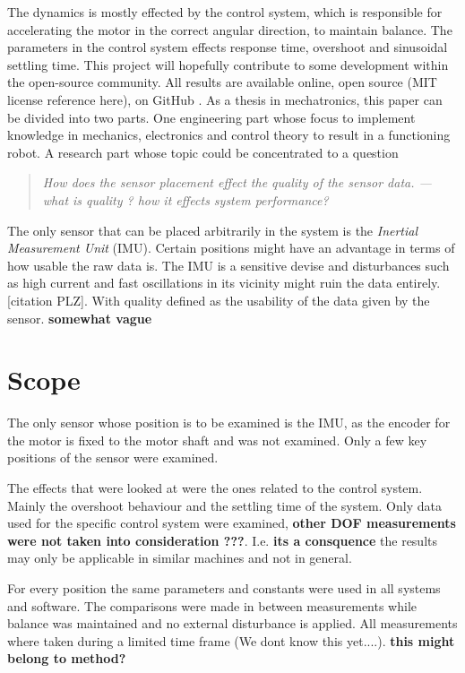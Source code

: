\documentclass[a4paper,11pt]{kth-mag}
\begin{document}
The dynamics is mostly effected by the control system, which is responsible for accelerating the motor in the  correct angular direction, to maintain balance. The parameters in the control system effects response time, overshoot and sinusoidal settling time.
This project will hopefully contribute to some development within the open-source community.
All results are available online, open source (MIT license reference here), on GitHub \cite{Github}.
As a thesis in mechatronics, this paper can be divided into two parts. One engineering part whose focus to implement knowledge in mechanics, electronics and control theory to result in a functioning robot. A research part whose topic could be concentrated to a question 

\begin{quote}
\textit{
How does the sensor placement effect the quality of the sensor data. --- what is quality ? how it effects system performance?}
\end{quote}
The only sensor that can be placed arbitrarily in the system is the \textit{Inertial Measurement Unit} (IMU). Certain positions might have an advantage in terms of how usable the raw data is. The IMU is a sensitive devise and disturbances such as high current and fast oscillations in its vicinity might ruin the data entirely.[citation PLZ]. With quality defined as the usability of the data given by the sensor. \textbf{somewhat vague}

\section{Scope}
The only sensor whose position is to be examined is the IMU, as the encoder for the motor is fixed to the motor shaft and was not examined. Only a few key positions of the sensor were examined.

The effects that were looked at were the ones related to the control system. Mainly the overshoot behaviour and the settling time of the system. Only data used for the specific control system were examined, \textbf{other DOF measurements were not taken into consideration ???}. I.e. \textbf{its a consquence} the results may only be applicable in similar machines and not in general.

For every position the same parameters and constants were used in all systems and software. The comparisons were made in between measurements while balance was maintained and no external disturbance is applied. All measurements where taken during a limited time frame (We dont know this yet....).  \textbf{this might belong to method?}
\end{document}

